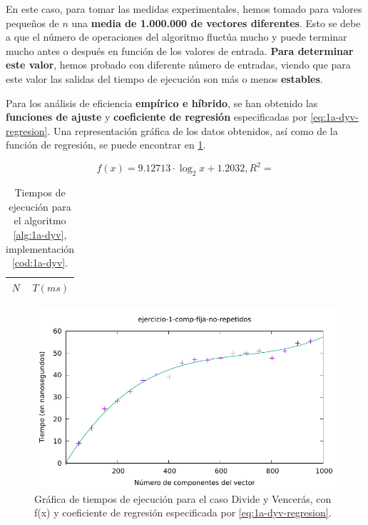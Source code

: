 En este caso, para tomar las medidas experimentales, hemos tomado para valores pequeños de $n$ una 
\textbf{media de 1.000.000 de vectores diferentes}. Esto se debe a que el número de operaciones del 
algoritmo fluctúa mucho y puede terminar mucho antes o después en función
de los valores de entrada. \textbf{Para determinar este valor}, hemos probado con diferente número de entradas, 
viendo que para este valor las salidas del tiempo de ejecución son más o menos \textbf{estables}. 

Para los análisis de eficiencia \textbf{empírico e híbrido}, se han obtenido las \textbf{funciones de ajuste}
y \textbf{coeficiente de regresión} especificadas por \ref{eq:1a-dyv-regresion}. Una representación
gráfica de los datos obtenidos, así como de la función de regresión, se puede encontrar en \ref{fig:1a-dyv-graph}.

\begin{equation}
    \boxed{f(x) = 9.12713 \cdot \log_{2}{x} + 1.2032, R^2 = }
    \label{eq:1a-dyv-regresion}
\end{equation}

\begin{table}
	\footnotesize
	\centering
	\begin{tabular}{|r|r|}
		\hline
		$N$ & $T (ms)$ \\
		\hline
	\end{tabular}

    \caption{Tiempos de ejecución para el algoritmo \ref{alg:1a-dyv}, implementación \ref{cod:1a-dyv}.}
    \label{tab:1a-dyv}
\end{table}

\begin{figure}
	\centering
	\includegraphics[scale=0.76]{img/e1a-dyv}
	\caption{Gráfica de tiempos de ejecución para el caso Divide y Vencerás, 
		con f(x) y coeficiente de regresión especificada por \ref{eq:1a-dyv-regresion}.}
	\label{fig:1a-dyv-graph}
\end{figure}

